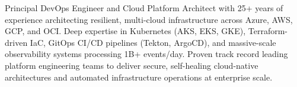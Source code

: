 
Principal DevOps Engineer and Cloud Platform Architect with 25+ years of experience architecting resilient, multi-cloud infrastructure across Azure, AWS, GCP, and OCI. Deep expertise in Kubernetes (AKS, EKS, GKE), Terraform-driven IaC, GitOps CI/CD pipelines (Tekton, ArgoCD), and massive-scale observability systems processing 1B+ events/day. Proven track record leading platform engineering teams to deliver secure, self-healing cloud-native architectures and automated infrastructure operations at enterprise scale.
